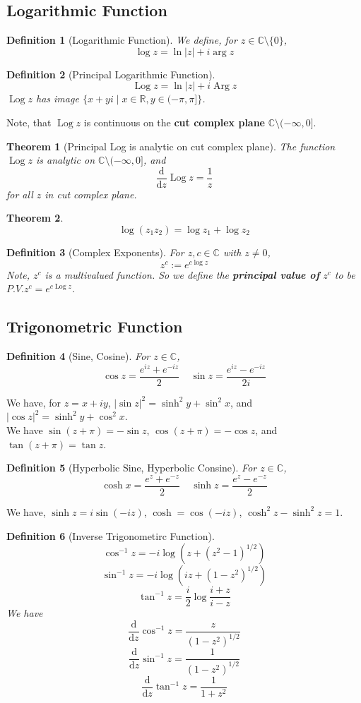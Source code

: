 \documentclass[12pt]{article}
\newcommand{\diff}{\mathrm{d}}
\newtheorem{definition}{Definition}[section]
\newtheorem{theorem}{Theorem}[section]
\theoremstyle{definition}
\DeclareMathOperator{\Log}{Log}
\DeclareMathOperator{\Arg}{Arg}
\begin{document}
\subsection{Logarithmic Function}
\begin{definition}[Logarithmic Function]
\normalfont We define, for $z\in\mathbb{C}\setminus\{0\}$,
\[
\log z = \ln |z| + i\arg z
\]
\end{definition}
\begin{definition}[Principal Logarithmic Function]
\normalfont 
\[
\Log z = \ln |z| + i\Arg z
\]
$\Log z$ has image $\{x+yi\mid x\in\mathbb{R}, y\in (-\pi, \pi]\}$.
\end{definition}
Note, that $\Log z$ is continuous on the \textbf{cut complex plane} $\mathbb{C}\setminus(-\infty, 0]$.
\begin{theorem}[Principal Log is analytic on cut complex plane]
\normalfont
The function $\Log z$ is analytic on $\mathbb{C}\setminus(-\infty, 0]$, and
\[
\frac{\diff}{\diff z}\Log z = \frac{1}{z}
\]
for all $z$ in cut complex plane.
\end{theorem}
\begin{theorem}\[\log(z_1z_2) = \log z_1 + \log z_2\]\end{theorem}
\begin{definition}[Complex Exponents]
\normalfont For $z,c\in \mathbb{C}$ with $z\neq 0$, 
\[
z^c:=e^{c\log z}
\]
Note, $z^c$ is a multivalued function. So we define the \textbf{principal value of }$z^c$ to be $P.V. z^c=e^{c\Log z}$.
\end{definition}
\subsection{Trigonometric Function}
\begin{definition}[Sine, Cosine]
\normalfont For $z\in \mathbb{C}$,
\[
\cos z = \frac{e^{iz}+e^{-iz}}{2}\;\;\;\;\sin z =\frac{e^{iz}-e^{-iz}}{2i}
\]
\end{definition}
We have, for $z=x+iy$, $|\sin z|^2 = \sinh^2 y + \sin^2 x$, and $|\cos z|^2 = \sinh^2 y + \cos^2 x$.\\
We have $\sin(z+\pi) = -\sin z$, $\cos(z+\pi)=-\cos z$, and $\tan(z+\pi) = \tan z$.\\
\begin{definition}[Hyperbolic Sine, Hyperbolic Consine]
\normalfont For $z\in \mathbb{C}$, 
\[
\cosh x = \frac{e^z +e^{-z}}{2}\;\;\;\;\sinh z = \frac{e^z - e^{-z}}{2}
\]
\end{definition}
We have, $\sinh z = i\sin(-iz)$, $\cosh = \cos(-iz)$, $\cosh^2 z - \sinh^2 z = 1$.
\begin{definition}[Inverse Trigonometirc Function]
\[
\cos^{-1}z = -i\log(z+(z^2-1)^{1/2})
\]
\[
\sin^{-1}z = -i\log(iz + (1-z^2)^{1/2})
\]
\[
\tan^{-1}z = \frac{i}{2}\log\frac{i+z}{i-z}
\]
We have
\[
\frac{\diff}{\diff z}\cos^{-1}z = \frac{z}{(1-z^2)^{1/2}}
\]
\[
\frac{\diff}{\diff z}\sin^{-1}z = \frac{1}{(1-z^2)^{1/2}}
\]
\[
\frac{\diff}{\diff z}\tan^{-1}z = \frac{1}{1+z^2}
\]
\end{definition}
\end{document}
